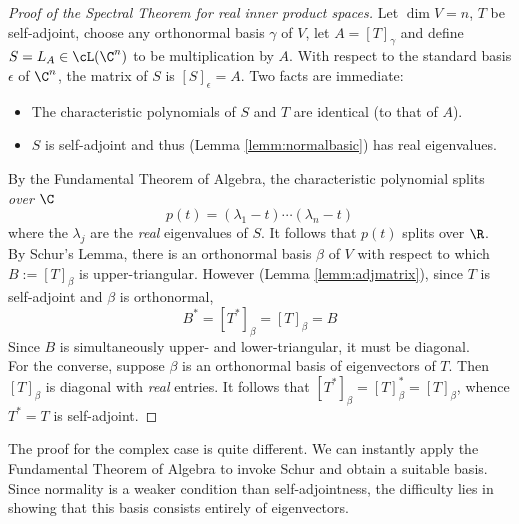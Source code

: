 \begin{proof}[Proof of the Spectral Theorem for real inner product spaces]
Let $\dim V=n$, $T$ be self-adjoint, choose any orthonormal basis $\gamma$ of $V$, let $A=[T]_\gamma$ and define $S=L_A\in\cL(\C^n)$ to be multiplication by $A$. With respect to the standard basis $\epsilon$ of $\C^n$, the matrix of $S$ is $[S]_\epsilon=A$. Two facts are immediate:
\begin{itemize}
  \item The characteristic polynomials of $S$ and $T$ are identical (to that of $A$).
  \item $S$ is self-adjoint and thus (Lemma \ref{lemm:normalbasic}) has real eigenvalues.
\end{itemize}
By the Fundamental Theorem of Algebra, the characteristic polynomial splits \emph{over $\C$}
\[p(t)=(\lambda_1-t)\cdots(\lambda_n-t)\]
where the $\lambda_j$ are the \emph{real} eigenvalues of $S$. It follows that $p(t)$ splits over $\R$.\\[5pt]
By Schur's Lemma, there is an orthonormal basis $\beta$ of $V$ with respect to which $B:=[T]_\beta$ is upper-triangular. However (Lemma \ref{lemm:adjmatrix}), since $T$ is self-adjoint and $\beta$ is orthonormal,
\[B^*=[T^*]_\beta=[T]_\beta=B\]
Since $B$ is simultaneously upper- and lower-triangular, it must be diagonal.\\[5pt]
For the converse, suppose $\beta$ is an orthonormal basis of eigenvectors of $T$. Then $[T]_\beta$ is diagonal with \emph{real} entries. It follows that $[T^*]_\beta=[T]_\beta^*=[T]_\beta$, whence $T^*=T$ is self-adjoint.
\end{proof}

The proof for the complex case is quite different. We can instantly apply the Fundamental Theorem of Algebra to invoke Schur and obtain a suitable basis. Since normality is a weaker condition than self-adjointness, the difficulty lies in showing that this basis consists entirely of eigenvectors.

